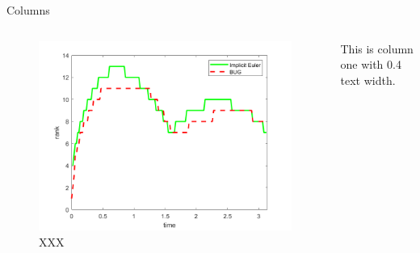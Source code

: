 \documentclass[compress,aspectratio=43]{beamer}
\begin{document}
\begin{frame}{Columns}
    \begin{columns}
        \begin{figure}
            \includegraphics[width=\linewidth]{rank-time.png}
            \caption{XXX}
        \end{figure}
        This is column one with 0.4 text width.
    \end{columns}
\end{frame}
\end{document}
